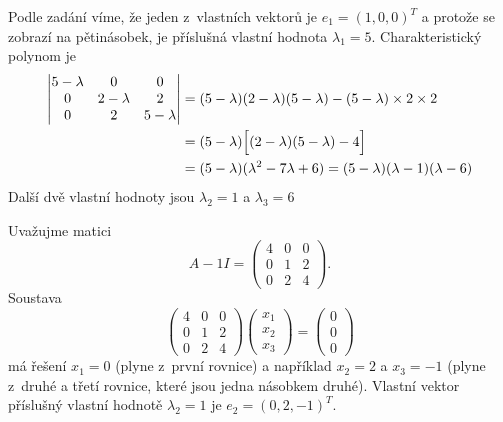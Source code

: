\reseni
Podle zadání víme, že jeden z vlastních vektorů je $e_1=(1,0,0)^T$ a protože se zobrazí na pětinásobek, je příslušná vlastní hodnota $\lambda_1=5$. Charakteristický polynom je
\begin{equation*}
  \begin{aligned}
  \begin{vmatrix}
  5-\lambda & 0 & 0\\
  0 & 2-\lambda & 2\\
  0 & 2 & 5-\lambda
\end{vmatrix}
&=(5-\lambda)(2-\lambda)(5-\lambda)-(5-\lambda)\times 2\times 2\\& =
(5-\lambda)\Bigl[(2-\lambda)(5-\lambda) -4\Bigr]
\\&=(5-\lambda)(\lambda^2 -7\lambda +6)
=(5-\lambda)(\lambda-1)(\lambda-6)
\end{aligned}
\end{equation*}
Další dvě vlastní hodnoty jsou $\lambda_2=1$ a $\lambda_3=6$

Uvažujme matici
\begin{equation*}
  A-1 I=
  \begin{pmatrix}
    4 & 0 & 0\\
    0 & 1 & 2\\
    0 & 2& 4
  \end{pmatrix}.
\end{equation*}
Soustava
\begin{equation*}
  \begin{pmatrix}
    4 & 0 & 0\\
    0 & 1 & 2\\
    0 & 2& 4
  \end{pmatrix}
  \begin{pmatrix}
    x_1\\x_2\\x_3
  \end{pmatrix}
  =
  \begin{pmatrix}
    0 \\0\\0
  \end{pmatrix}
\end{equation*}
má řešení $x_1=0$ (plyne z první rovnice) a například $x_2=2$ a $x_3=-1$ (plyne z druhé a třetí rovnice, které jsou jedna násobkem druhé). Vlastní vektor příslušný vlastní hodnotě $\lambda_2=1$ je $e_2=(0,2,-1)^T$.


